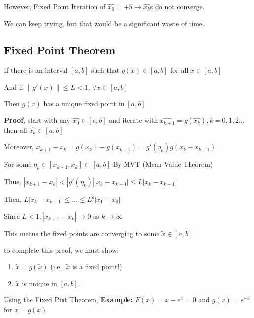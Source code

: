 \documentclass{article}
\begin{document}
However, Fixed Point Iteration of $\hat{x_0} = +5 \to \hat{x_k}$s do not converge.

We can keep trying, but that would be a significant waste of time.

\subsection{Fixed Point Theorem}

If there is an interval $[a, b]$ such that $g(x) \in [a,b]$ for all $x \in [a,b]$

And if $\| g'(x) \| \leq L < 1$, $\forall x \in [a,b]$

Then $g(x)$ has a unique fixed point in $[a,b]$

\vspace{0.2cm}

\textbf{Proof}, start with any $\hat{x_0} \in [a,b]$ and iterate with $\hat{x_{k + 1}} = g(\hat{x_k}), k = 0, 1, 2 \dots$ then all $\hat{x_k} \in [a, b]$


Moreover, $x_{k + 1} - x_{k} = g(x_k) - g(x_{k - 1}) = g'(\eta_k) g(x_k - x_{k - 1})$

For some $\eta_k \in [x_{k - 1}, x_k] \subset [a,b]$ By MVT (Mean Value Theorem)


Thus, $|x_{k + 1} - x_k| < | g'(\eta_k) | |x_k - x_{k - 1}| \leq L |x_k - x_{k - 1}| $

\vspace{0.2cm}

Then, $L|x_k - x_{k - 1}| \leq \dots \leq L^k |x_1 - x_0|$

Since $L < 1, | x_{k + 1} - x_k | \to 0$ as $k \to \infty$

\vspace{0.2cm}

This means the fixed points are converging to some $\tilde{x} \in [a,b]$

to complete this proof, we must show:

\begin{enumerate}
    \item $\tilde{x} = g(\tilde{x})$ (i.e., $\tilde{x}$ is a fixed point!)
    
    \item $\tilde{x}$ is unique in $[a, b]$.
\end{enumerate}

\vspace{0.2cm}

Using the Fixed Pint Theorem, \textbf{Example:} $F(x) = x - e^x = 0$ and $g(x) = e^{-x}$ for $x = g(x)$
\end{document}
